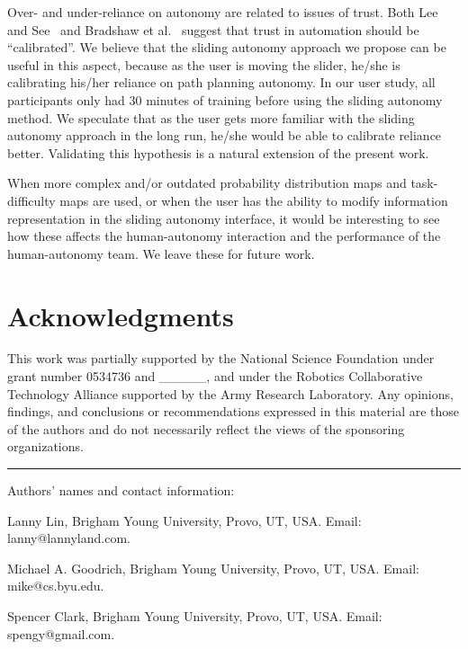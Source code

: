 \documentclass[lettersize, apacite, twoside, HRI]{apa_HRI}
\begin{document}
Over- and under-reliance on autonomy are related to issues of trust.  Both Lee and See~\cite{Lee2004Trust} and Bradshaw et al.\ \cite{Bradshaw2013Seven} suggest that trust in automation should be ``calibrated''. We believe that the sliding autonomy approach we propose can be useful in this aspect, because as the user is moving the slider, he/she is calibrating his/her reliance on path planning autonomy. In our user study, all participants only had 30 minutes of training before using the sliding autonomy method. We speculate that as the user gets more familiar with the sliding autonomy approach in the long run, he/she would be able to calibrate reliance better. Validating this hypothesis is a natural extension of the present work.

When more complex and/or outdated probability distribution maps and task-difficulty maps are used, or when the user has the ability to modify information representation in the sliding autonomy interface, it would be interesting to see how these affects the human-autonomy interaction and the performance of the human-autonomy team. We leave these for future work.

\section*{Acknowledgments}

This work was partially supported by 
the National Science Foundation 
under grant number 
0534736 and \_\_\_\_\_, 
and under the Robotics Collaborative Technology Alliance supported by the Army Research Laboratory. Any opinions, findings, and conclusions or recommendations expressed in this material are those of the authors and do not necessarily reflect the views of the sponsoring organizations.



\hrule
\vspace*{.1in}
Authors' names and contact information: 

Lanny Lin, Brigham Young University, Provo, UT, USA.  Email: lanny@lannyland.com.  

Michael A. Goodrich, Brigham Young University, Provo, UT, USA.  Email: mike@cs.byu.edu.

Spencer Clark, Brigham Young University, Provo, UT, USA.  Email: spengy@gmail.com.
\end{document}
